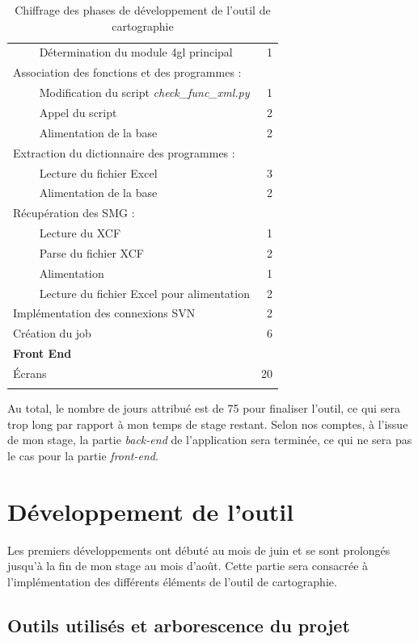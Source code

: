 \documentclass{polytech/polytech}
\begin{document}
\begin{longtable}{|L{12cm}|r|}
	~~\llap{\textbullet}~~ Détermination du module 4gl principal & 1 \\
	Association des fonctions et des programmes : & \\
	~~\llap{\textbullet}~~ Modification du script \textit{check\_func\_xml.py} & 1 \\ 
	~~\llap{\textbullet}~~ Appel du script & 2 \\ 
	~~\llap{\textbullet}~~ Alimentation de la base & 2 \\ 
	Extraction du dictionnaire des programmes : & \\
	~~\llap{\textbullet}~~ Lecture du fichier Excel & 3 \\ 
	~~\llap{\textbullet}~~ Alimentation de la base & 2 \\ 
	Récupération des SMG : & \\
	~~\llap{\textbullet}~~ Lecture du XCF & 1 \\ 
	~~\llap{\textbullet}~~ Parse du fichier XCF & 2 \\ 
	~~\llap{\textbullet}~~ Alimentation & 1 \\ 
	~~\llap{\textbullet}~~ Lecture du fichier Excel pour alimentation & 2 \\ 
	Implémentation des connexions SVN & 2 \\
	\hline 
	Création du job	& 6 \\ 
	\hline 
	\textbf{Front End} &  \\ 
	Écrans & 20 \\
	\hline 
	\caption{Chiffrage des phases de développement de l'outil de cartographie }
\end{longtable} 


Au total, le nombre de jours attribué est de 75 pour finaliser l'outil, ce qui sera trop long par rapport à mon temps de stage restant. Selon nos comptes, à l'issue de mon stage, la partie \textit{back-end} de l'application sera terminée, ce qui ne sera pas le cas pour la partie \textit{front-end}.


\part{Développement de l'outil}
\label{part:dev}

Les premiers développements ont débuté au mois de juin et se sont prolongés jusqu'à la fin de mon stage au mois d'août. Cette partie sera consacrée à l'implémentation des différents éléments de l'outil de cartographie.

\chapter{Outils utilisés et arborescence du projet}
\end{document}
